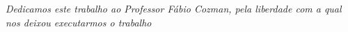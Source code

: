 \begin{dedicatoria}
   \vspace*{\fill}
   \centering
   \noindent
   \textit{ Dedicamos este trabalho ao Professor Fábio Cozman, pela liberdade com a qual nos deixou executarmos o trabalho } \vspace*{\fill}
\end{dedicatoria}